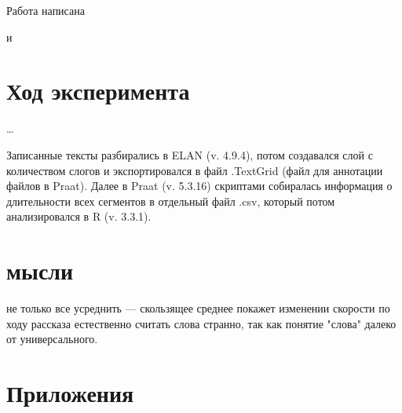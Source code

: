 \par \citep{osser64}
\par \citep{barik77}
\par \citep{vaane82}
\par \citep{brown85}
\par \citep{tauroza90}
\par \citep{uhmann92}
\par \citep{zellner94}
\par \citep{arnfield95}
\par Работа \citep{roach98} написана 
\par \citep{dellwo03}
\par \citep{pellegrino04} и \citep{pellegrino11}
\par \citep{hilton11}
\par \citep{pellegrino11}
\par \citep{stepanova11}
\par \citep{kendall13}
\par \citep{bosker15}
\par \citep{bosker16}
\section{Ход эксперимента}
\noindent …
\par Записанные тексты разбирались в ELAN (v. 4.9.4), потом создавался слой с количеством слогов и экспортировался в файл .TextGrid (файл для аннотации файлов в Praat). Далее в Praat (v. 5.3.16) скриптами собиралась информация о длительности всех сегментов в отдельный файл .csv, который потом анализировался в R (v. 3.3.1).
\section{мысли}
\begin{itemize}
\mytem не только все усреднить --- скользящее среднее покажет изменении скорости по ходу рассказа
\mytem естественно считать слова странно, так как понятие "слова" далеко от универсального.
\end{itemize}
\pagebreak
\footnotesize


\normalsize
\section{Приложения}
